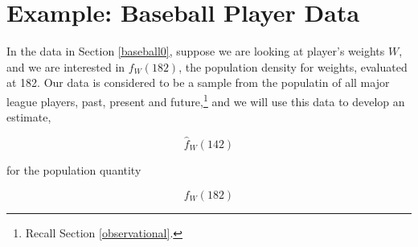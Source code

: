 % 
% 
% 
% 

\section{Example:  Baseball Player Data}

In the data in Section \ref{baseball0}, suppose we are looking at
player's weights $W$, and we are interested in $f_W(182)$, the
population density for weights, evaluated at 182.  Our 
data is considered to be a sample from the populatin of all major league
players, past, present and future,\footnote{Recall Section
\ref{observational}.} and we will use this data to develop an estimate,

\begin{equation}
\widehat{f}_W(142)
\end{equation}

for the population quantity

\begin{equation}
f_W(182)
\end{equation}

